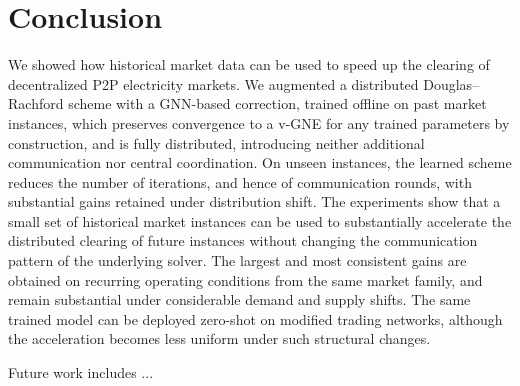 \documentclass[final]{l4dc2026}
\begin{document}
\newcommand{\TBD}[1]{\textcolor{red}{[#1]}}



\section{Conclusion}
\label{sec:conclusion}
We showed how historical market data can be used to speed up the clearing of decentralized P2P electricity markets. We augmented a distributed Douglas--Rachford scheme with a GNN-based correction, trained offline on past market instances, which preserves convergence to a v-GNE for any trained parameters by construction, and is fully distributed, introducing neither additional communication nor central coordination. On unseen instances, the learned scheme reduces the number of iterations, and hence of communication rounds, with substantial gains retained under distribution shift. The experiments show that a small set of historical market instances can be used to substantially accelerate the distributed clearing of future instances without changing the communication pattern of the underlying solver. The largest and most consistent gains are obtained on recurring operating conditions from the same market family, and remain substantial under considerable demand and supply shifts. The same trained model can be deployed zero-shot on modified trading networks, although the acceleration becomes less uniform under such structural changes.

Future work includes ...








\newpage
\appendix
\end{document}
